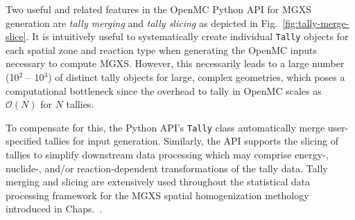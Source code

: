 Two useful and related features in the OpenMC Python \ac{API} for \ac{MGXS} generation are \textit{tally merging} and \textit{tally slicing} as depicted in Fig.~\ref{fig:tally-merge-slice}. It is intuitively useful to systematically create individual \texttt{Tally} objects for each spatial zone and reaction type when generating the OpenMC inputs necessary to compute \ac{MGXS}. However, this necessarily leads to a large number (10$^2$ -- 10$^3$) of distinct tally objects for large, complex geometries, which poses a computational bottleneck since the overhead to tally in OpenMC scales as $\mathcal{O}(N)$ for $N$ tallies. 

To compensate for this, the Python \ac{API}'s \texttt{Tally} class automatically merge user-specified tallies for input generation. Similarly, the \ac{API} supports the slicing of tallies to simplify downstream data processing which may comprise energy-, nuclide-, and/or reaction-dependent transformations of the tally data. Tally merging and slicing are extensively used throughout the statistical data processing framework for the \ac{MGXS} spatial homogenization methology introduced in Chaps.~.

